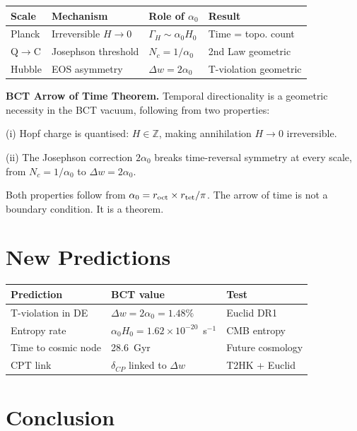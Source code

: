 \documentclass[aps,prl,twocolumn,showpacs,superscriptaddress]{revtex4-2}
\begin{document}
\begin{center}
\begin{tabular}{llll}
\toprule
Scale & Mechanism & Role of $\alpha_0$ & Result \\
\midrule
Planck & Irreversible $H\to 0$ & $\Gamma_H \sim \alpha_0 H_0$ & Time = topo. count \\
Q$\to$C & Josephson threshold & $N_c = 1/\alpha_0$ & 2nd Law geometric \\
Hubble & EOS asymmetry & $\Delta w = 2\alpha_0$ & T-violation geometric \\
\bottomrule
\end{tabular}
\end{center}

\textbf{BCT Arrow of Time Theorem.} Temporal directionality is a geometric 
necessity in the BCT vacuum, following from two properties:

(i) Hopf charge is quantised: $H \in \mathbb{Z}$, making annihilation 
$H \to 0$ irreversible.

(ii) The Josephson correction $2\alpha_0$ breaks time-reversal symmetry 
at every scale, from $N_c = 1/\alpha_0$ to $\Delta w = 2\alpha_0$.

Both properties follow from $\alpha_0 = r_{\rm oct} \times r_{\rm tet}/\pi$. 
The arrow of time is not a boundary condition. It is a theorem.

\section{New Predictions}

\begin{center}
\begin{tabular}{lll}
\toprule
Prediction & BCT value & Test \\
\midrule
T-violation in DE & $\Delta w = 2\alpha_0 = 1.48\%$ & Euclid DR1 \\
Entropy rate & $\alpha_0 H_0 = 1.62\times10^{-20}$~s$^{-1}$ & CMB entropy \\
Time to cosmic node & 28.6~Gyr & Future cosmology \\
CPT link & $\delta_{CP}$ linked to $\Delta w$ & T2HK + Euclid \\
\bottomrule
\end{tabular}
\end{center}

\section{Conclusion}
\end{document}
